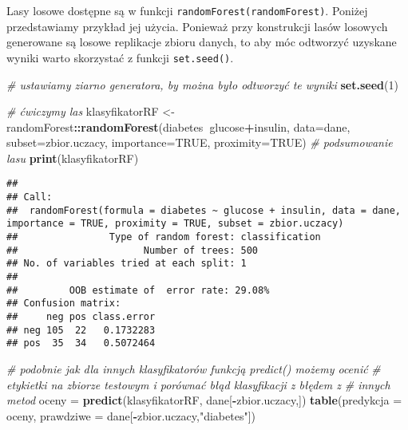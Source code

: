 \documentclass[polish,]{book}
\newenvironment{Shaded}{\begin{snugshade}}{\end{snugshade}}
\newcommand{\CommentTok}[1]{\textcolor[rgb]{0.56,0.35,0.01}{\textit{#1}}}
\newcommand{\DataTypeTok}[1]{\textcolor[rgb]{0.13,0.29,0.53}{#1}}
\newcommand{\DecValTok}[1]{\textcolor[rgb]{0.00,0.00,0.81}{#1}}
\newcommand{\KeywordTok}[1]{\textcolor[rgb]{0.13,0.29,0.53}{\textbf{#1}}}
\newcommand{\NormalTok}[1]{#1}
\newcommand{\OperatorTok}[1]{\textcolor[rgb]{0.81,0.36,0.00}{\textbf{#1}}}
\newcommand{\OtherTok}[1]{\textcolor[rgb]{0.56,0.35,0.01}{#1}}
\newcommand{\StringTok}[1]{\textcolor[rgb]{0.31,0.60,0.02}{#1}}
\begin{document}
Lasy losowe dostępne są w funkcji \texttt{randomForest(randomForest)}. Poniżej przedstawiamy przykład jej użycia. Ponieważ przy konstrukcji lasów losowych generowane
są losowe replikacje zbioru danych, to aby móc odtworzyć uzyskane wyniki warto
skorzystać z funkcji \texttt{set.seed()}.

\begin{Shaded}
\begin{Highlighting}[]
\CommentTok{# ustawiamy ziarno generatora, by można było odtworzyć te wyniki}
\KeywordTok{set.seed}\NormalTok{(}\DecValTok{1}\NormalTok{)}

\CommentTok{# ćwiczymy las}
\NormalTok{klasyfikatorRF <-}\StringTok{ }\NormalTok{randomForest}\OperatorTok{::}\KeywordTok{randomForest}\NormalTok{(diabetes}\OperatorTok{~}\NormalTok{glucose}\OperatorTok{+}\NormalTok{insulin,}
                                             \DataTypeTok{data=}\NormalTok{dane,}
                                             \DataTypeTok{subset=}\NormalTok{zbior.uczacy, }\DataTypeTok{importance=}\OtherTok{TRUE}\NormalTok{, }\DataTypeTok{proximity=}\OtherTok{TRUE}\NormalTok{)}
\CommentTok{# podsumowanie lasu}
\KeywordTok{print}\NormalTok{(klasyfikatorRF)}
\end{Highlighting}
\end{Shaded}

\begin{verbatim}
## 
## Call:
##  randomForest(formula = diabetes ~ glucose + insulin, data = dane,      importance = TRUE, proximity = TRUE, subset = zbior.uczacy) 
##                Type of random forest: classification
##                      Number of trees: 500
## No. of variables tried at each split: 1
## 
##         OOB estimate of  error rate: 29.08%
## Confusion matrix:
##     neg pos class.error
## neg 105  22   0.1732283
## pos  35  34   0.5072464
\end{verbatim}

\begin{Shaded}
\begin{Highlighting}[]
\CommentTok{# podobnie jak dla innych klasyfikatorów funkcją predict() możemy ocenić}
\CommentTok{# etykietki na zbiorze testowym i porównać błąd klasyfikacji z błędem z}
\CommentTok{# innych metod}
\NormalTok{oceny =}\StringTok{ }\KeywordTok{predict}\NormalTok{(klasyfikatorRF, dane[}\OperatorTok{-}\NormalTok{zbior.uczacy,])}
\KeywordTok{table}\NormalTok{(}\DataTypeTok{predykcja =}\NormalTok{ oceny, }\DataTypeTok{prawdziwe =}\NormalTok{ dane[}\OperatorTok{-}\NormalTok{zbior.uczacy,}\StringTok{"diabetes"}\NormalTok{])}
\end{Highlighting}
\end{Shaded}
\end{document}
